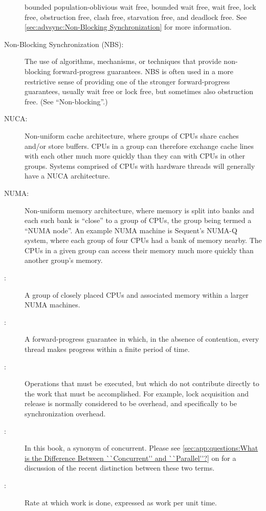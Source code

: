 \begin{description}
	bounded population-oblivious wait free,
	bounded wait free,
	wait free,
	lock free,
	obstruction free,
	clash free,
	starvation free, and
	deadlock free.
	See \cref{sec:advsync:Non-Blocking Synchronization}
	for more information.
\item[Non-Blocking Synchronization (NBS):]
	The use of algorithms, mechanisms, or techniques that provide
	non-blocking forward-progress guarantees.
	NBS is often used in a more restrictive sense of providing one
	of the stronger forward-progress guarantees, usually wait free or
	lock free, but sometimes also obstruction free.
	(See ``Non-blocking''.)
\item[NUCA:]
	Non-uniform cache architecture, where groups of CPUs share
	caches and/or store buffers.
	CPUs in a group can therefore exchange cache lines with each
	other much more quickly than they can with CPUs in other groups.
	Systems comprised of CPUs with hardware threads will generally
	have a NUCA architecture.
\item[NUMA:]
	Non-uniform memory architecture, where memory is split into
	banks and each such bank is ``close'' to a group of CPUs,
	the group being termed a ``NUMA node''.
	An example NUMA machine is Sequent's NUMA-Q system, where
	each group of four CPUs had a bank of memory nearby.
	The CPUs in a given group can access their memory much
	more quickly than another group's memory.
\item[\IXGaltr{NUMA Node}{NUMA node}:]
	A group of closely placed CPUs and associated memory within
	a larger NUMA machines.
\item[\IXG{Obstruction Free}:]
	A forward-progress guarantee in which, in the absence of
	contention, every thread makes progress within a finite
	period of time.
\item[\IXG{Overhead}:]
	Operations that must be executed, but which do not contribute
	directly to the work that must be accomplished.
	For example, lock acquisition and release is normally considered
	to be overhead, and specifically to be synchronization overhead.
\item[\IXG{Parallel}:]
	In this book, a synonym of concurrent.
	Please see \cref{sec:app:questions:What is the Difference Between ``Concurrent'' and ``Parallel''?}
	on 
	for a discussion of the recent distinction between these two
	terms.
\item[\IXG{Performance}:]
	Rate at which work is done, expressed as work per unit time.

\end{description}
